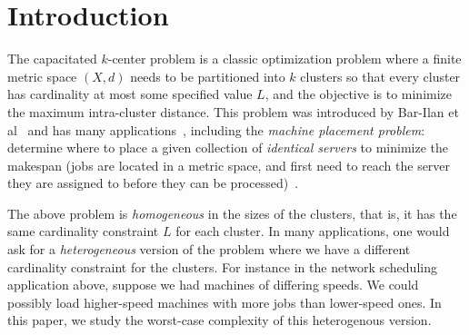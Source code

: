 \iffalse
\section{Introduction}
The capacitated $k$-center problem is a classic optimization problem where a finite metric space $(X,d)$ needs to be partitioned into $k$ clusters so that  every  cluster has cardinality at most
some specified value $L$, and the objective is to minimize the maximum intra-cluster distance. This problem was introduced by Bar-Ilan et al~\cite{Bar-IlanKP93} and has many applications~\cite{LuptonMY98,MorganL77,Murthy1983AnAA}, including %
the {\em machine placement problem}: determine where to place a given collection of \emph{identical servers} to minimize the makespan (jobs are located in a metric space, and first need to reach the server they are assigned to before they can be processed)~\cite{PSW97}. %

The above problem is {\em homogeneous} in the sizes of the clusters, that is, it has the same cardinality constraint $L$ for each cluster. In many applications, one would ask for a \emph{heterogeneous} version of the problem where we have a different cardinality constraint for the clusters.
For instance in the network scheduling application above, suppose we had machines of differing speeds. We could possibly load higher-speed machines with more jobs than lower-speed ones. In this paper, we study  the worst-case complexity of this heterogenous version.

